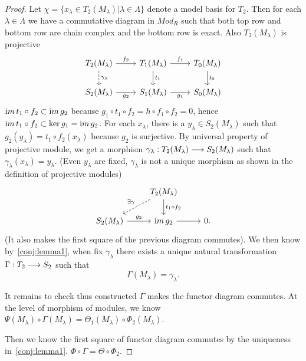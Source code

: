 \documentclass[11pt]{book} %
\begin{document}
\begin{proof}
Let $\chi=\{x_\lambda\in T_2(M_\lambda)|\lambda\in \Lambda\}$ denote a model basis for $T_2$. Then for each $\lambda\in \Lambda$ we have a commutative diagram in $Mod_R$ such that both top row and bottom row are chain complex and the bottom row is exact. Also $T_2(M_\lambda)$ is projective 
\[
\begin{tikzcd}
T_2(M_\lambda)\ar[d, dashed, "\gamma_\lambda"] \arrow[r, "f_2"] & T_1(M_\lambda) \arrow[r, "f_1"] \arrow[d, "t_1"] & T_0(M_\lambda) \arrow[d, "t_0"] \\
S_2(M_\lambda) \arrow[r, "g_2"'] & S_1(M_\lambda) \arrow[r, "g_1"'] & S_0(M_\lambda)
\end{tikzcd}
\]
${\text im\thinspace} t_1\circ f_2\subset {\text im\thinspace} g_2$ because $g_1\circ t_1\circ f_2=h\circ f_1\circ f_2=0$, hence ${\text im\thinspace} t_1\circ f_2\subset \ker g_1={\text im\thinspace} g_2$. For each $x_\lambda$, there is a $y_\lambda\in S_2(M_\lambda)$ such that $g_2(y_\lambda)=t_1\circ f_2(x_\lambda)$ because $g_2$ is surjective. By universal property of projective module, we get a morphism $\gamma_\lambda:T_2(M_\lambda)\longrightarrow S_2(M_\lambda)$ such that $\gamma_\lambda(x_\lambda)=y_\lambda$. (Even $y_\lambda$ are fixed, $\gamma_\lambda$ is not a unique morphism as shown in the definition of projective modules)
\[
\begin{tikzcd}
 & T_2(M_\lambda) \arrow[d, "t_1\circ f_2"] \arrow[ld, "\exists \gamma"', dashed] &  \\
S_2(M_\lambda) \arrow[r, "g_2"] & \im g_2 \arrow[r] & 0.
\end{tikzcd}
\]
(It also makes the first square of the previous diagram commutes).
We then know by~\ref{conj:lemma1}, when fix $\gamma_\lambda$ there exists a unique natural transformation $\Gamma: T_2\longrightarrow S_2$ such that
$$
\Gamma(M_\lambda)=\gamma_\lambda.
$$ 

It remains to check thus constructed $\Gamma$ makes the functor diagram commutes.
At the level of morphism of modules, we know $\Psi(M_\lambda)\circ \Gamma(M_\lambda)=\Theta_1(M_\lambda)\circ \Phi_2(M_\lambda)$.
 
 Then we know the first square of functor diagram commutes by the uniqueness in~\ref{conj:lemma1}. $\Phi\circ \Gamma=\Theta\circ \Phi_2$.
\end{proof}
\end{document}
